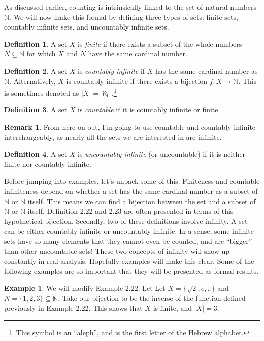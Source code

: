 \documentclass{article}
\newcommand{\N}{\mathbb{N}}
\theoremstyle{definition}
\newtheorem{definition}{Definition}[section]
\newtheorem{example}{Example}[section]
\newtheorem{remark}{Remark}[section]
\begin{document}
	As discussed earlier, counting is intrinsically linked to the set of natural numbers $ \N $. We will now make this formal by defining three types of sets: finite sets, countably infinite sets, and uncountably infinite sets.
	\begin{definition}
		A set $ X $ is \textit{\color{red}finite} if there exists a subset of the whole numbers $ N\subseteq \N $ for which $ X $ and $ N $ have the same cardinal number.
	\end{definition} 
	\begin{definition}
		A set $ X $ is \textit{\color{red}countably infinite} if $ X $ has the same cardinal number as $ \N $. Alternatively, $ X $ is countably infinite if there exists a bijection $ f:X\to\N $. This is sometimes denoted as $ |X|=\aleph_0 $.\footnote{This symbol is an ``aleph'', and is the first letter of the Hebrew alphabet.} 
	\end{definition}
	\begin{definition}
		A set $ X $ is \textit{\color{red}countable} if it is countably infinite or finite.
	\end{definition}
	\begin{remark}
		From here on out, I'm going to use countable and countably infinite interchangeably, as nearly all the sets we are interested in are infinite.  
	\end{remark}
	\begin{definition}
		A set $ X $ is  \textit{\color{red}uncountably infinite} (or uncountable) if it is neither finite nor countably infinite.
	\end{definition}
	Before jumping into examples, let's unpack some of this. Finiteness and countable infiniteness depend on whether a set has the same cardinal number as a subset of $ \N $ or $ \N $ itself. This means we can find a bijection between the set and a subset of $ \N $ or $ \N $ itself. Definition 2.22 and 2.23 are often presented in terms of this hypothetical bijection. Secondly, two of these definitions involve infinity. A set can be either countably infinite or uncountably infinite. In a sense, some infinite sets have so many elements that they cannot even be counted, and are ``bigger'' than other uncountable sets! These two concepts of infinity will show up constantly in real analysis. Hopefully examples will make this clear. Some of the following examples are so important that they will be presented as formal results. 
	\begin{example}
		We will modify Example 2.22. Let Let $ X=\{\sqrt{2},e,\pi\} $ and $ N=\{1,2,3\}\subseteq \N$. Take our bijection to be the inverse of the function defined previously in Example 2.22. This shows that $ X $ is finite, and $ |X|=3 $. 
	\end{example}
\end{document}
